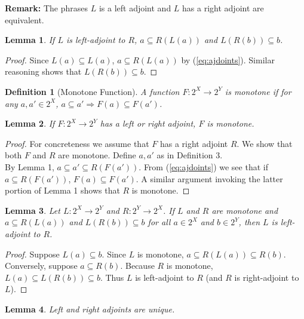 \documentclass{article}
\newtheorem{lemma}{Lemma}
\newtheorem{definition}{Definition}
\begin{document}
\textbf{Remark:} The phrases $L$ is a left adjoint and $L$ has a right adjoint are equivalent. 

\begin{lemma}
If $L$ is left-adjoint to $R$, $a \subseteq R(L(a))$ and $L(R(b)) \subseteq b$.
\end{lemma}

\begin{proof}
Since $L(a) \subseteq L(a)$, $a \subseteq R(L(a))$ by (\ref{eq:ajdoints}). Similar reasoning shows that $L(R(b)) \subseteq b$.
\end{proof}

\begin{definition}[Monotone Function]
A function $F : 2^X \to 2^Y$ is monotone if for any $a, a' \in 2^X$, $a \subseteq a' \Rightarrow F(a) \subseteq F(a')$.
\end{definition}

\begin{lemma}
If $F : 2^X \to 2^Y$ has a left or right adjoint, $F$ is monotone.
\end{lemma}

\begin{proof}
For concreteness we assume that $F$ has a right adjoint $R$. We show that both $F$ and $R$ are monotone. Define $a, a'$ as in Definition 3.\\

By Lemma 1, $a \subseteq a' \subseteq R(F(a'))$. From (\ref{eq:ajdoints}) we see that if $a \subseteq R(F(a'))$, $F(a) \subseteq F(a')$. A similar argument invoking the latter portion of Lemma 1 shows that $R$ is monotone.
\end{proof}

\begin{lemma}
Let $L : 2^X \to 2^Y$ and $R : 2^Y \to 2^X$. If $L$ and $R$ are monotone and $a \subseteq R(L(a))$ and $L(R(b)) \subseteq b$ for all $a \in 2^X$ and $b \in 2^Y$, then $L$ is left-adjoint to $R$.
\end{lemma}

\begin{proof}
Suppose $L(a) \subseteq b$. Since $L$ is monotone, $a \subseteq R(L(a)) \subseteq R(b)$. Conversely, suppose $a \subseteq R(b)$. Because $R$ is monotone, $L(a) \subseteq L(R(b)) \subseteq b$. Thus $L$ is left-adjoint to $R$ (and $R$ is right-adjoint to $L$).
\end{proof}

\begin{lemma}
Left and right adjoints are unique.
\end{lemma}
\end{document}

